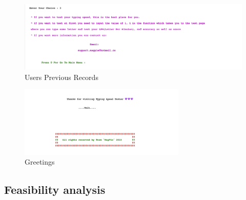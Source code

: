 \newpage
\begin{figure}[h]
     \includegraphics[scale=1,width=\textwidth]{CodeScreenShot/HelpSection.png}
    \caption{Users Previous Records}
    \label{fig:code-screenshots}
\end{figure}
\begin{figure}[h]
\centering
     \includegraphics[scale=0.2, width={300px}]{CodeScreenShot/Ending line.png}
    \caption{Greetings}
    \label{fig:code-screenshots}
\end{figure}
\newpage

\subsection{Feasibility analysis}

